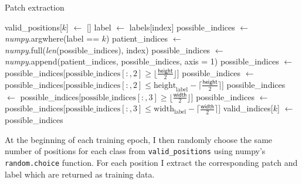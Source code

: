 \documentclass[12pt,a4paper,twoside,openright]{report}
\begin{document}
\begin{algorithm}[h]
\caption{Patch extraction}\label{alg:patch_extraction}
\begin{algorithmic}[1]
	\State valid\_positions[$k$] $\gets$ []
		\State label $\gets$ labels[index] 
		\State possible\_indices $\gets$ \textit{numpy}.argwhere(label == $k$)
		\State patient\_indices $\gets$ \textit{numpy}.full(\textit{len}(possible\_indices), index)
		\State possible\_indices $\gets$ \textit{numpy}.append(patient\_indices, possible\_indices, axis = 1)
		\State
		\State possible\_indices $\gets$ possible\_indices[$\text{possible\_indices}[:,2] \ge \lfloor \frac{\textsf{height}}{2} \rfloor$]
		\State possible\_indices $\gets$ possible\_indices[$\text{possible\_indices}[:,2] \leq \text{height}_{\text{label}} - \lceil \frac{\textsf{height}}{2} \rceil$]
		\State possible\_indices $\gets$ possible\_indices[$\text{possible\_indices}[:,3] \ge \lfloor \frac{\textsf{width}}{2} \rfloor$]
		\State possible\_indices $\gets$ possible\_indices[$\text{possible\_indices}[:,3]  \leq  \text{width}_{\text{label}} - \lceil \frac{\textsf{width}}{2} \rceil$]
		\State
		\State valid\_indices[$k$] $\gets$ possible\_indices
	\EndFor
\EndFor
\end{algorithmic}
\end{algorithm}

At the beginning of each training epoch, I then randomly choose the same number of positions for each class from \texttt{valid\_positions} using numpy's \texttt{random.choice} function. For each position I extract the corresponding patch and label which are returned as training data.
\end{document}
